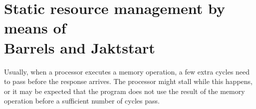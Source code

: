 \documentclass[../main/report.tex]{subfiles}
\begin{document}
\section{Static resource management by means of\\
Barrels and Jaktstart}

Usually, when a processor executes a memory operation, a few extra cycles need to pass before the response arrives.
The processor might stall while this happens, or it may be expected that the program does not use the result of the memory operation before a sufficient number of cycles pass.
\end{document}

